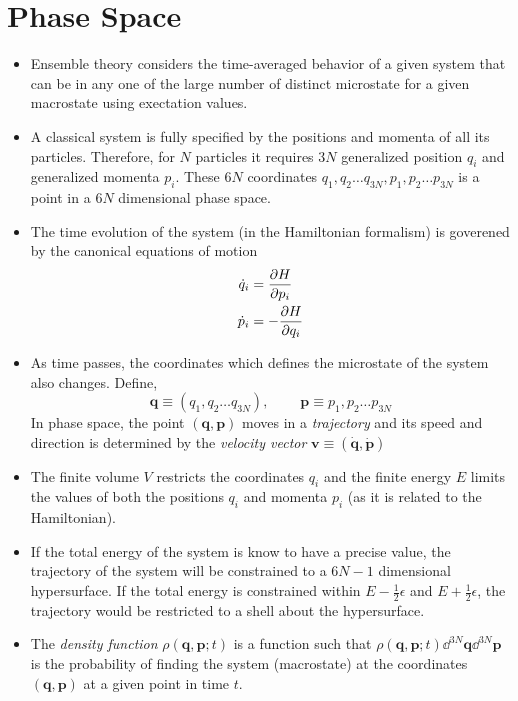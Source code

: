 \documentclass{article}
\newcommand{\smallspace}{\:\:\:\:\:\:\:\:\:\:}
\newcommand{\ve}{\mathbf}
\begin{document}
\section{Phase Space}
\begin{itemize}
    \item Ensemble theory considers the time-averaged behavior of a given system that can be in any one of the large number of distinct microstate for a given macrostate using exectation values.
    \item A classical system is fully specified by the positions and momenta of all its particles. Therefore, for $N$ particles it requires $3N$ generalized position $q_i$ and generalized momenta $p_i$. These $6N$ coordinates $q_1,q_2\dots q_{3N},p_1,p_2\dots p_{3N}$ is a point in a $6N$ dimensional phase space.
    \item The time evolution of the system (in the Hamiltonian formalism) is goverened by the canonical equations of motion 
    \begin{align}
        \dot q_i&=\partialderivative{H}{p_i}\label{position}\\
        \dot p_i&=-\partialderivative{H}{q_i}\label{momentum}
    \end{align}
    \item As time passes, the coordinates which defines the microstate of the system also changes. Define,
    \begin{equation}
        \ve q\equiv (q_1,q_2\dots q_{3N}),\smallspace \ve p\equiv p_1,p_2\dots p_{3N}
    \end{equation}
    In phase space, the point $(\ve q,\ve p)$ moves in a \textit{trajectory} and its speed and direction is determined by the \textit{velocity vector} $\mathbf{v}\equiv (\dot{\ve q},\dot{\ve p})$
    \item The finite volume $V$ restricts the coordinates $q_i$ and the finite energy $E$ limits the values of both the positions $q_i$ and momenta $p_i$ (as it is related to the Hamiltonian).
    \item If the total energy of the system is know to have a precise value, the trajectory of the system will be constrained to a $6N-1$ dimensional hypersurface. If the total energy is constrained within $E-\frac{1}{2}\epsilon$ and $E+\frac{1}{2}\epsilon$, the trajectory would be restricted to a shell about the hypersurface.
    \item The \textit{density function} $\rho(\ve q,\ve p;t)$ is a function such that $\rho(\ve q,\ve p;t)\dd^{3N}\ve q\dd^{3N}\ve p$ is the probability of finding the system (macrostate) at the coordinates $(\ve q,\ve p)$ at a given point in time $t$. 

\end{itemize}
\end{document}
